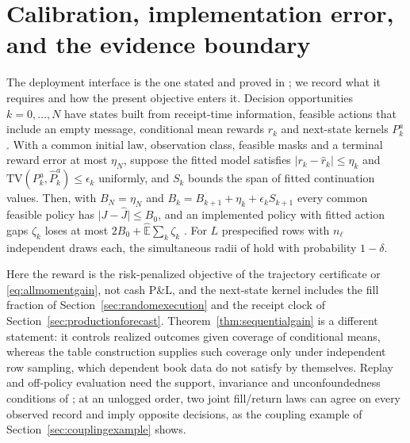 \section{Calibration, implementation error, and the evidence boundary}\label{sec:deploymentcalibration}
The deployment interface is the one stated and proved in
\citet[Section~39]{NoguerAlonso2026Execution}; we record what it requires and how the
present objective enters it. Decision opportunities $k=0,\dots,N$ have states
built from receipt-time information, feasible actions that include an empty
message, conditional mean rewards $r_k$ and next-state kernels $P_k^a$. With a common initial law, observation class, feasible masks and a terminal
reward error at most $\eta_N$, suppose the
fitted model satisfies $\lvert r_k-\widehat r_k\rvert\le\eta_k$ and
$\mathrm{TV}(P_k^a,\widehat P_k^a)\le\epsilon_k$ uniformly, and $S_k$ bounds the
span of fitted continuation values. Then, with $B_N=\eta_N$ and
$B_k=B_{k+1}+\eta_k+\epsilon_kS_{k+1}$ every common feasible policy has
$\lvert J-\widehat J\rvert\le B_0$, and an implemented policy with fitted action
gaps $\zeta_k$ loses at most $2B_0+\widehat{\mathbb E}\sum_k\zeta_k$
\citep[Theorem~39.1]{NoguerAlonso2026Execution}. For $L$ prespecified rows with
$n_\ell$ independent draws each, the simultaneous radii of
\citet[Proposition~39.2]{NoguerAlonso2026Execution} hold with probability $1-\delta$.

Here the reward is the risk-penalized objective of the trajectory certificate or \eqref{eq:allmomentgain}, not cash
P\&L, and the next-state kernel includes the fill fraction of Section~\ref{sec:randomexecution} and the
receipt clock of Section~\ref{sec:productionforecast}. Theorem~\ref{thm:sequentialgain} is a different
statement: it controls realized outcomes given coverage of conditional means,
whereas the table construction supplies such coverage only under independent
row sampling, which dependent book data do not satisfy by themselves. Replay
and off-policy evaluation need the support, invariance and unconfoundedness
conditions of \citet[Section~39.4]{NoguerAlonso2026Execution}; at an unlogged order, two
joint fill/return laws can agree on every observed record and imply opposite
decisions, as the coupling example of Section~\ref{sec:couplingexample} shows.
